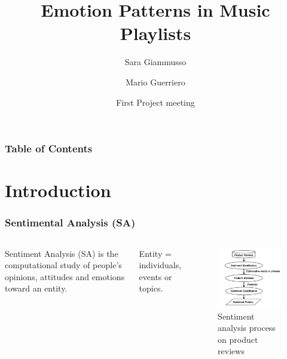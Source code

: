 \documentclass[xcolor=dvipsnames]{beamer}
\title[Emotion Patterns in Music Playlists] %
{Emotion Patterns in Music Playlists}
\author[Sara, Mario] %
{Sara Giammusso\inst{1}\inst{2} \and Mario Guerriero \inst{1}\inst{2}}
\institute[EURECOM] %
{
 \inst{1}
 Data Science Department, EURECOM, T\'el\'ecom ParisTech, France\\
  \inst{2}%
 Department of Control and Computer Engineering, Politecnico di Torino, Italy
}
\date[2018 March 22] %
{First Project meeting}
\begin{document}
\frame{\titlepage}

\begin{frame}
\frametitle{Table of Contents}
\tableofcontents
\end{frame}

\section{Introduction}
\begin{frame}
\frametitle{Sentimental Analysis (SA)}
\begin{columns}
\begin{definition}
Sentiment Analysis (SA) is the computational study of people's opinions, attitudes and emotions toward an entity.
\end{definition}
Entity = individuals, events or topics.
\begin{figure}
	\centering
	\includegraphics[scale=0.45]{./images/sa_process}
	\caption{Sentiment analysis process on product reviews}
\end{figure}
\end{columns}
\end{frame}
\end{document}
